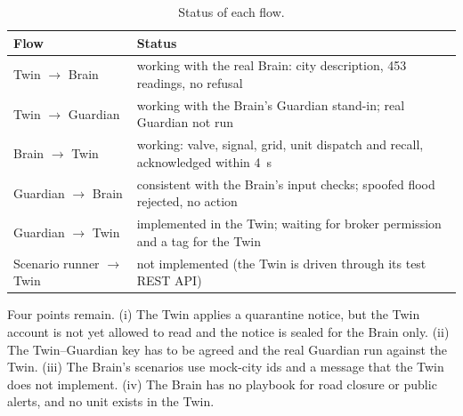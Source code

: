 \begin{table}[t]
\centering
\caption{Status of each flow.}
\label{tab:status}
\footnotesize
\renewcommand{\arraystretch}{1.05}
\begin{tabular}{@{}l p{5.5cm}@{}}
\toprule
\textbf{Flow} & \textbf{Status}\\
\midrule
Twin $\to$ Brain & working with the real Brain: city description, 453 readings, no refusal\\
Twin $\to$ Guardian & working with the Brain's Guardian stand-in; real Guardian not run\\
Brain $\to$ Twin & working: valve, signal, grid, unit dispatch and recall, acknowledged within 4~s\\
Guardian $\to$ Brain & consistent with the Brain's input checks; spoofed flood rejected, no action\\
Guardian $\to$ Twin & implemented in the Twin; waiting for broker permission and a tag for the Twin\\
Scenario runner $\to$ Twin & not implemented (the Twin is driven through its test REST API)\\
\bottomrule
\end{tabular}
\end{table}

Four points remain. (i) The Twin applies a quarantine notice, but the Twin account is not yet allowed to read
 and the notice is sealed for the Brain only. (ii) The Twin--Guardian key has to be agreed and the
real Guardian run against the Twin. (iii) The Brain's scenarios use mock-city ids and a  message that the Twin does not
implement. (iv) The Brain has no playbook for road closure or public alerts, and no  unit exists in the Twin.
